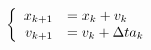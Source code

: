 \documentclass{article}
\begin{document}
\thispagestyle{empty}


$$
\left \{ \begin{array}{r l}
x_{k+1} & = x_k + v_k\\
v_{k+1} & = v_k + \Delta t a_k
\end{array} \right.
$$
\end{document}
